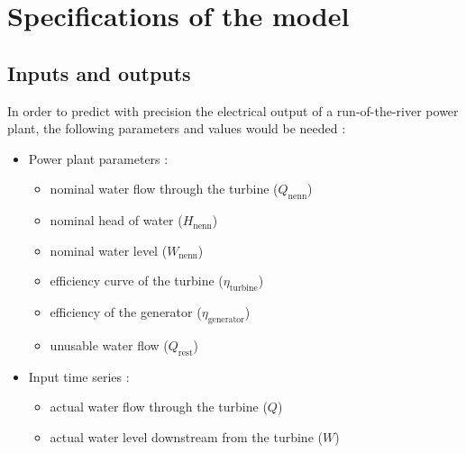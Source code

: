 \section{Specifications of the model}

\subsection{Inputs and outputs}
\label{in_out}

In order to predict with precision the electrical output of a run-of-the-river power plant, the following parameters and values would be needed : 
\begin{itemize}
\itemsep0em
 \item Power plant parameters : 
 \begin{itemize}
  \item nominal water flow through the turbine ($Q_\mathrm{nenn}$)
  \item nominal head of water ($H_\mathrm{nenn}$)
  \item nominal water level ($W_\mathrm{nenn}$)
  \item efficiency curve of the turbine ($\eta_\mathrm{turbine}$) 
  \item efficiency of the generator ($\eta_\mathrm{generator}$)  
  \item unusable water flow ($Q_\mathrm{rest}$)  
 \end{itemize}
 \item Input time series : 
 \begin{itemize}
  \item actual water flow through the turbine ($Q$)
  \item actual water level downstream from the turbine ($W$)
 \end{itemize}
\end{itemize}

